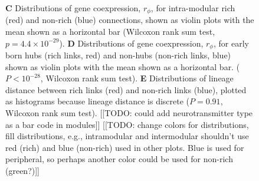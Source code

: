 \documentclass[10pt,letterpaper]{article}
\begin{document}
\begin{figure}[!h]
{%
\textbf{C} Distributions of gene coexpression, $r_\phi$, for intra-modular rich (red) and non-rich (blue) connections, shown as violin plots with the mean shown as a horizontal bar (Wilcoxon rank sum test, $p = 4.4\times 10^{-29}$).
\textbf{D} Distributions of gene coexpression, $r_\phi$, for early born hubs (rich links, red) and non-hubs (non-rich links, blue) shown as violin plots with the mean shown as a horizontal bar. ($P < 10^{-28}$, Wilcoxon rank sum test).
\textbf{E} Distributions of lineage distance between rich links (red) and non-rich links (blue), plotted as histograms because lineage distance is discrete ($P = 0.91$, Wilcoxon rank sum test).
[[TODO: could add neurotransmitter type as a bar code in modules]]
[[TODO: change colors for distributions, fill distributions, e.g., intramodular and intermodular shouldn't use red (rich) and blue (non-rich) used in other plots. Blue is used for peripheral, so perhaps another color could be used for non-rich (green?)]]
}
 \label{fig:OtherInfluences}
\end{figure}
\end{document}

